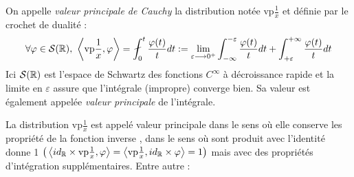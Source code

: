 \begin{definition}\label{def:vp&Hilb}
	On appelle \emph{valeur principale de Cauchy} la distribution notée vp$\frac{1}{x}$ et définie par le crochet de dualité :
	\begin{equation}
		\forall \varphi\in\mathcal{S}(\R),\ \left\langle \text{vp}\frac{1}{x}, \varphi \right\rangle = \fint_0^t \frac{\varphi(t)}{t}dt := \lim_{\varepsilon\lr0^+} \int_{-\infty}^{-\varepsilon} \frac{\varphi(t)}{t}dt + \int_{+\varepsilon}^{+\infty} \frac{\varphi(t)}{t}dt
	\end{equation}
	Ici $\mathcal{S}(\mathbb{R})$ est l’espace de Schwartz des fonctions $C^\infty$ à décroissance rapide et la limite en $\varepsilon$ assure que l'intégrale (impropre) converge bien. Sa valeur est également appelée \emph{valeur principale} de l'intégrale. 
\end{definition}

La distribution vp$\frac{1}{x}$ est appelé valeur principale dans le sens où elle conserve les propriété de la fonction inverse , dans le sens où sont produit avec l'identité donne 1 $\big(\left\langle id_{\mathbb{R}} \times \text{vp}\frac{1}{x}, \varphi \right\rangle = \left\langle \text{vp}\frac{1}{x}, id_{\mathbb{R}} \times\varphi \right\rangle=1\big)$ mais avec des propriétés d'intégration supplémentaires. Entre autre :
\\

